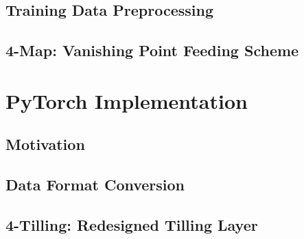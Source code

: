 \begin{spacing}{1.5}
\subsection{Training Data Preprocessing}

\subsection{4-Map: Vanishing Point Feeding Scheme}


\section{PyTorch Implementation}
\label{sec:MD_PyTorch}

\subsection{Motivation}

\subsection{Data Format Conversion}

\subsection{4-Tilling: Redesigned Tilling Layer}


\end{spacing}
\newpage
